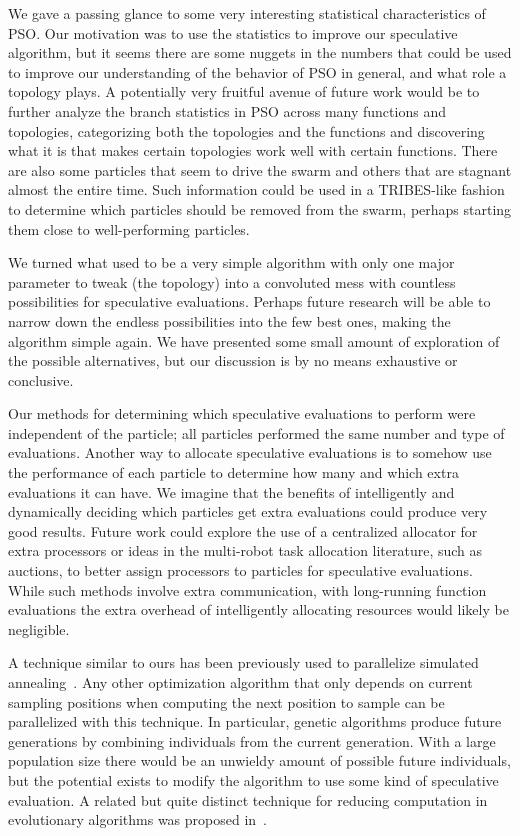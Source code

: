 \documentclass[journal,letterpaper]{IEEEtran}
\begin{document}
We gave a passing glance to some very interesting statistical characteristics
of PSO.  Our motivation was to use the statistics to improve our speculative
algorithm, but it seems there are some nuggets in the numbers that could be
used to improve our understanding of the behavior of PSO in general, and what
role a topology plays.  A potentially very fruitful avenue of future work would
be to further analyze the branch statistics in PSO across many functions and
topologies, categorizing both the topologies and the functions and discovering
what it is that makes certain topologies work well with certain functions.
There are also some particles that seem to drive the swarm and others that are
stagnant almost the entire time.  Such information could be used in a
TRIBES-like fashion~\cite{clerc-2003-tribes} to determine which particles should be
removed from the swarm, perhaps starting them close to well-performing
particles.

We turned what used to be a very simple algorithm with only one major parameter
to tweak (the topology) into a convoluted mess with countless possibilities for
speculative evaluations.  Perhaps future research will be able to narrow down
the endless possibilities into the few best ones, making the algorithm simple
again.  We have presented some small amount of exploration of the possible
alternatives, but our discussion is by no means exhaustive or conclusive.

Our methods for determining which speculative evaluations to perform were
independent of the particle; all particles performed the same number and type
of evaluations.  Another way to allocate speculative evaluations is to somehow
use the performance of each particle to determine how many and which extra
evaluations it can have.  We imagine that the benefits of intelligently and
dynamically deciding which particles get extra evaluations could produce very
good results.  Future work could explore the use of a centralized allocator for
extra processors or ideas in the multi-robot task allocation literature, such
as auctions, to better assign processors to particles for speculative
evaluations.  While such methods involve extra communication, with long-running
function evaluations the extra overhead of intelligently allocating resources
would likely be negligible.

A technique similar to ours has been previously used to parallelize simulated
annealing~\cite{witte-1991-parallel-simulated-annealing-speculative}.  Any other optimization algorithm that only
depends on current sampling positions when computing the next position to
sample can be parallelized with this technique.  In particular, genetic
algorithms produce future generations by combining individuals from the current
generation.  With a large population size there would be an unwieldy amount of
possible future individuals, but the potential exists to modify the algorithm
to use some kind of speculative evaluation.  A related but quite distinct
technique for reducing computation in evolutionary algorithms was proposed
in~\cite{poli-2006-backward-chaining-evolutionary-algorithms}.
\end{document}
